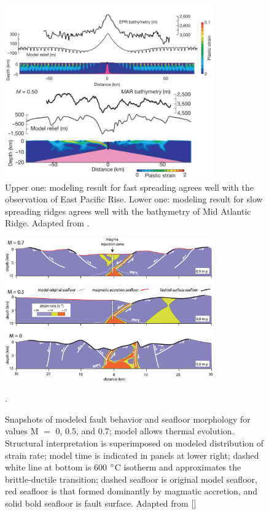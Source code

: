 \begin{figure}[h]
 \centering
  \includegraphics[width=0.8\textwidth]{./Figures/fig_Intro5_1.png}
 \caption[2D model results adapted from \citep{Buck2005}.]{Upper one: modeling result for fast spreading agrees well with the observation of East Pacific Rise. Lower one: modeling result for slow spreading ridges agrees well with the bathymetry of Mid Atlantic Ridge. Adapted from \citep{Buck2005}.}
 \label{fig_Intro5_1}
\end{figure}

\begin{figure}[h]
 \centering
  \includegraphics[width=0.8\textwidth]{./Figures/fig_Intro_Tucholke2008.eps}
 \caption[2D model results adapted from \citep{Tucholke2008,Whitney2012}.]{Snapshots of modeled fault behavior and seafloor morphology for values M $=$ 0, 0.5, and 0.7; model allows thermal evolution. Structural interpretation is superimposed on modeled distribution of strain rate; model time is indicated in panels at lower right; dashed white line at bottom is 600 $\degree$C isotherm and approximates the brittle-ductile transition; dashed seafloor is original model seafloor, red seafloor is that formed dominantly by magmatic accretion, and solid bold seafloor is fault surface. Adapted from [\citealp{Tucholke2008,Whitney2012}]}.
 \label{fig_Intro6_1}
\end{figure}

